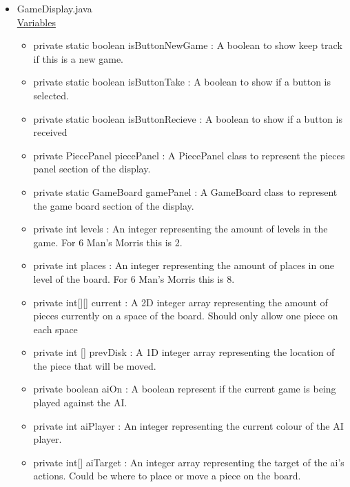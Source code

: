 \documentclass[12pt]{article}
\begin{document}
\begin{itemize}
		\item GameDisplay.java \\
		\underline{Variables}
		\begin{itemize}
			\item private static boolean isButtonNewGame : A boolean to show keep track if this is a new game.
			\item private static boolean isButtonTake : A boolean to show if a button is selected.
			\item private static boolean isButtonRecieve : A boolean to show if a button is received
			\item private PiecePanel piecePanel : A PiecePanel class to represent the pieces panel section of the display.
			\item private static GameBoard gamePanel : A GameBoard class to represent the game board section of the display.
			\item private int levels : An integer representing the amount of levels in the game. For 6 Man's Morris this is 2.
			\item private int places : An integer representing the amount of places in one level of the board. For 6 Man's Morris this is 8.
			\item private int[][] current : A 2D integer array representing the amount of pieces currently on a space of the board. Should only allow one piece on each space
			\item private int [] prevDisk : A 1D integer array representing the location of the piece that will be moved.
			\item private boolean aiOn : A boolean represent if the current game is being played against the AI.
			\item private int aiPlayer : An integer representing the current colour of the AI player.
			\item private int[] aiTarget : An integer array representing the target of the ai's actions. Could be where to place or move a piece on the board.
		

\end{itemize}
\end{itemize}
\end{document}
